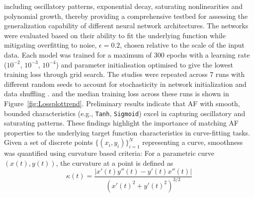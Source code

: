 \documentclass[manuscript, screen, review]{jair}
\begin{document}
including oscillatory patterns, exponential decay, saturating nonlinearities 
and polynomial growth, thereby providing a comprehensive testbed for assessing the 
generalization capability of different neural network architectures. 
The networks were evaluated based on their ability to fit the underlying 
function while mitigating overfitting to noise, $\epsilon = 0.2$, chosen relative to the scale of the input data. Each model was trained for 
a maximum of 300 epochs with a learning rate ($10^{-2}$, $10^{-3}$, $10^{-4}$) and parameter initialisation 
optimised to give the lowest training loss through grid search.
The studies were repeated across 7 runs with different random seeds to 
account for stochasticity in network initialization and data shuffling \cite{Dushatskiy_2022}.
and the median training loss across these runs is shown in 
Figure~\ref{fig:Lossplottrend}.
Preliminary results indicate that AF with smooth, bounded characteristics 
(e.g., \texttt{Tanh}, \texttt{Sigmoid}) excel in capturing oscillatory 
and saturating patterns.
These findings highlight the importance of matching AF properties 
to the underlying target function characteristics in curve-fitting tasks.
Given a set of discrete points $\{(x_i, y_i)\}_{i=1}^N$ representing a curve, 
smoothness was quantified using curvature based criteria:
For a parametric curve $(x(t), y(t))$, the curvature at a point is defined as
\begin{equation}
\kappa(t) = \frac{|x'(t)y''(t) - y'(t)x''(t)|}{\left( x'(t)^2 + y'(t)^2 \right)^{3/2}}
\end{equation}
\end{document}
